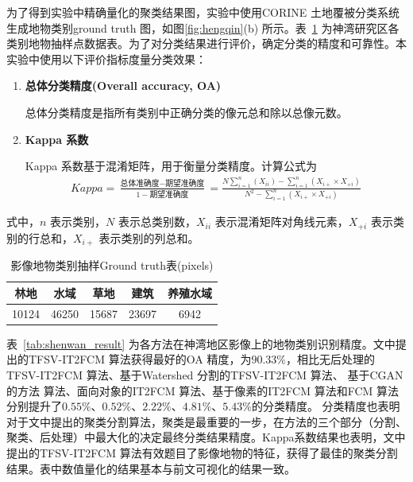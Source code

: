 为了得到实验中精确量化的聚类结果图，实验中使用CORINE 土地覆被分类系统生成地物类别ground truth 图，如图\ref{fig:hengqin}(b) 所示。表~\ref{tab:shenwan_data} 为神湾研究区各类别地物抽样点数据表。为了对分类结果进行评价，确定分类的精度和可靠性。本实验中使用以下评价指标度量分类效果：
\begin{enumerate}
    \item \textbf{总体分类精度(Overall accuracy, OA)}

          总体分类精度是指所有类别中正确分类的像元总和除以总像元数。
    \item \textbf{Kappa 系数}

          Kappa 系数基于混淆矩阵，用于衡量分类精度。计算公式为
          \begin{equation}\label{eq:kappa}
              \begin{split}
                  Kappa = \frac{\mbox{总体准确度}-\mbox{期望准确度}}{1-\mbox{期望准确度}} = \frac{N\sum_{i=1}^n(X_{ii}) - \sum_{i=1}^n(X_{i+} \times X_{+i})}{N^2 - \sum_{i=1}^n(X_{i+} \times X_{+i})}
              \end{split}
          \end{equation}
\end{enumerate}
式中，$n$ 表示类别，$N$ 表示总类别数，$X_{ii}$ 表示混淆矩阵对角线元素，$X_{+i}$ 表示类别的行总和，$X_{i+}$ 表示类别的列总和。


\begin{table}[htb]
    \caption{影像地物类别抽样Ground truth表(pixels)}\label{tab:shenwan_data}
    \centering
    \begin{tabular}{ccccc}
        \toprule
        林地  & 水域  & 草地  & 建筑  & 养殖水域 \\
        \midrule
        10124 & 46250 & 15687 & 23697 & 6942     \\
        \bottomrule
    \end{tabular}
\end{table}


表~\ref{tab:shenwan_result} 为各方法在神湾地区影像上的地物类别识别精度。文中提出的TFSV-IT2FCM 算法获得最好的OA 精度，为$90.33\%$，相比无后处理的TFSV-IT2FCM 算法、基于Watershed 分割的TFSV-IT2FCM 算法、 基于CGAN 的方法 算法、面向对象的IT2FCM 算法、基于像素的IT2FCM 算法和FCM 算法分别提升了$0.55\%$、$0.52\%$、$2.22\%$、$4.81\%$、$5.43\%$的分类精度。
分类精度也表明对于文中提出的聚类分割算法，聚类是最重要的一步，在方法的三个部分（分割、聚类、后处理）中最大化的决定最终分类结果精度。Kappa系数结果也表明，文中提出的TFSV-IT2FCM 算法有效题目了影像地物的特征，获得了最佳的聚类分割结果。表中数值量化的结果基本与前文可视化的结果一致。

